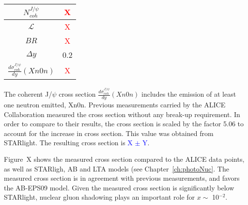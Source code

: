 \begin{table}
  \centering
  \begin{tabular}{|c|c|} \hline 
    $N^{J/\psi}_{coh}$ & \textcolor{red}{X} \\ \hline  
    $\mathcal{L}$ & \textcolor{red}{X} \\ \hline
    $BR$ & \textcolor{red}{X} \\ \hline
    $\Delta y$ & 0.2 \\ \hline \hline 
    $\frac{d\sigma^{J/\psi}_{coh}}{dy} (Xn0n)$ & \textcolor{red}{X} \\ \hline 
  \end{tabular}
  \caption{\label{tab:nJpCoh}}
\end{table}  

The coherent J/$\psi$ cross section $\frac{d\sigma^{J/\psi}_{coh}}{dy} (Xn0n)$ includes the emission of at least one neutron emitted, Xn0n. Previous measurements carried 
by the ALICE Collaboration measured the cross section without any break-up requirement. In order to compare to their results, the cross section is scaled by the 
factor 5.06 to account for the increase in cross section. This value was obtained from STARlight. The resulting cross section is \textcolor{blue}{X $\pm$ Y}.

Figure~X shows the measured cross section compared to the ALICE data points, as well as STARligh, AB and LTA models (see Chapter~\ref{ch:photoNuc}. The measured cross section is in agreement with previous measurements, and favors the AB-EPS09 model. Given the measured cross section is significantly below STARlight, nuclear gluon shadowing plays an important role for $x\sim$ 10$^{-2}$. 

